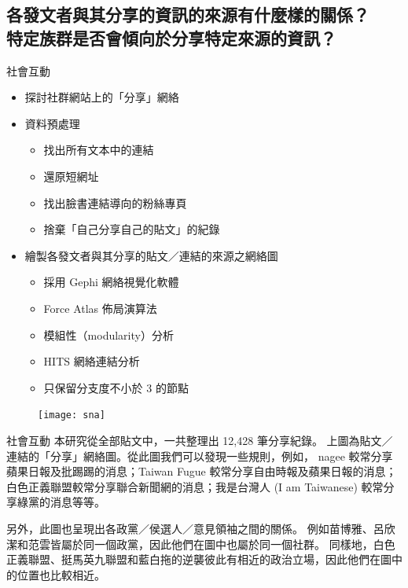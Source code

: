 \documentclass{beamer}
\begin{document}
\begin{CJK}{UTF8}{bkai}
\section{
各發文者與其分享的資訊的來源有什麼樣的關係？\texorpdfstring{\protect\\}{}
\hspace{.35em}特定族群是否會傾向於分享特定來源的資訊？
}

\begin{frame}{社會互動}
\begin{itemize}
\item 探討社群網站上的「分享」網絡
\item 資料預處理
  \begin{itemize}
  \item 找出所有文本中的連結
  \item 還原短網址
  \item 找出臉書連結導向的粉絲專頁
  \item 捨棄「自己分享自己的貼文」的紀錄
  \end{itemize}
\item 繪製各發文者與其分享的貼文／連結的來源之網絡圖
  \begin{itemize}
  \item 採用 Gephi 網絡視覺化軟體
  \item Force Atlas 佈局演算法
  \item 模組性（modularity）分析
  \item HITS 網絡連結分析
  \item 只保留分支度不小於 3 的節點
  \end{itemize}
\end{itemize}
\end{frame}

\begin{frame}[plain]
\begin{figure}
  \texttt{[image: sna]}
\end{figure}
\end{frame}

\begin{frame}{社會互動}
\justifying
\qquad 本研究從全部貼文中，一共整理出 12,428 筆分享紀錄。%
上圖為貼文／連結的「分享」網絡圖。從此圖我們可以發現一些規則，例如，%
nagee 較常分享蘋果日報及批踢踢的消息；Taiwan Fugue 較常分享自由時報及蘋果日報的消息；%
白色正義聯盟較常分享聯合新聞網的消息；我是台灣人 (I am Taiwanese) 較常分享綠黨的消息等等。\par
\qquad 另外，此圖也呈現出各政黨／侯選人／意見領袖之間的關係。%
例如苗博雅、呂欣潔和范雲皆屬於同一個政黨，因此他們在圖中也屬於同一個社群。%
同樣地，白色正義聯盟、挺馬英九聯盟和藍白拖的逆襲彼此有相近的政治立場，因此他們在圖中的位置也比較相近。\par
\end{frame}


\end{CJK}
\end{document}
